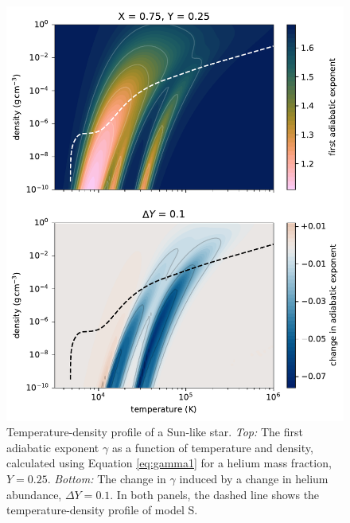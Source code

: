 \begin{figure}
    \centering
    \includegraphics{figures/adiabatic-ionisation-temp.pdf}
    \caption{Temperature-density profile of a Sun-like star. \emph{Top:} The first adiabatic exponent \(\gamma\) as a function of temperature and density, calculated using Equation \ref{eq:gamma1} for a helium mass fraction, \(Y=0.25\). \emph{Bottom:} The change in \(\gamma\) induced by a change in helium abundance, \(\Delta Y = 0.1\). In both panels, the dashed line shows the temperature-density profile of model S.}
    \label{fig:gamma-temp-density}
\end{figure}

